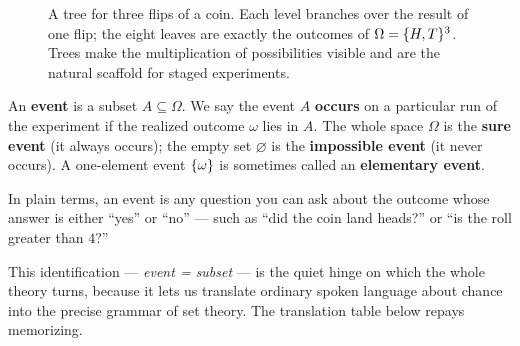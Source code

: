 \begin{figure}[H]
\centering
{}
\caption{A tree for three flips of a coin. Each level branches over the result of
one flip; the eight leaves are exactly the outcomes of
$\Omega=\{H,T\}^3$. Trees make the multiplication of possibilities visible and
are the natural scaffold for staged experiments.}
\label{ch03:fig-tree}
\end{figure}

\begin{definition}[Event]
\label{ch03:def-event}
An \textbf{event} is a subset $A \subseteq \Omega$. We say the event $A$
\textbf{occurs} on a particular run of the experiment if the realized outcome
$\omega$ lies in $A$. The whole space $\Omega$ is the \textbf{sure event} (it
always occurs); the empty set $\varnothing$ is the \textbf{impossible event} (it
never occurs). A one-element event $\{\omega\}$ is sometimes called an
\textbf{elementary event}.
\end{definition}

In plain terms, an event is any question you can ask about the outcome whose
answer is either ``yes'' or ``no'' --- such as ``did the coin land heads?'' or
``is the roll greater than $4$?''

This identification --- \emph{event = subset} --- is the quiet hinge on which
the whole theory turns, because it lets us translate ordinary spoken language
about chance into the precise grammar of set theory. The translation table below
repays memorizing.

